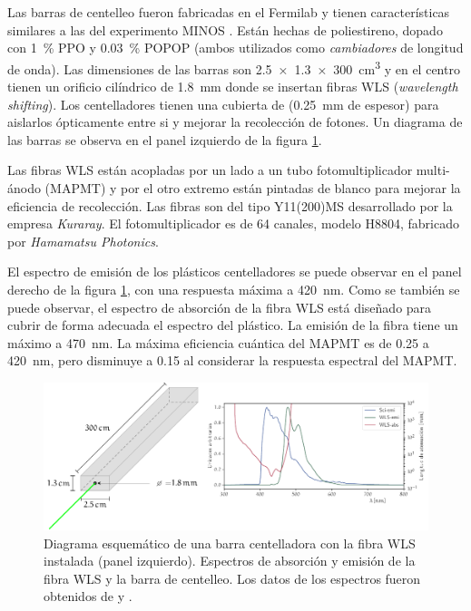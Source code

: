 Las barras de centelleo fueron fabricadas en el Fermilab y tienen características similares a las del experimento MINOS \cite{knitta04}. Están hechas de poliestireno, dopado con \SI{1}{\percent} PPO y \SI{0.03}{\percent} POPOP (ambos utilizados como \emph{cambiadores} de longitud de onda). Las dimensiones de las barras son \SI[product-units=power]{2.5x1.3x300}{\cubic\cm} y en el centro tienen un orificio cilíndrico de \SI{1.8}{\mm} donde se insertan fibras WLS (\emph{wavelength shifting}). Los centelladores tienen una cubierta de  (\SI{0.25}{\mm} de espesor) para aislarlos ópticamente entre si y mejorar la recolección de fotones. Un diagrama de las barras se observa en el panel izquierdo de la figura \ref{fig:scibar-optics}.

Las fibras WLS están acopladas por un lado a un tubo fotomultiplicador multi-ánodo (MAPMT) y por el otro extremo están pintadas de blanco para mejorar la eficiencia de recolección. Las fibras son del tipo Y11(200)MS desarrollado por la empresa \emph{Kuraray}. El fotomultiplicador es de \num{64} canales, modelo H8804, fabricado por \emph{Hamamatsu Photonics}.

El espectro de emisión de los plásticos centelladores se puede observar en el panel derecho de la figura \ref{fig:scibar-optics}, con una respuesta máxima a \SI{420}{\nano\metre}. Como se también se puede observar, el espectro de absorción de la fibra WLS está diseñado para cubrir de forma adecuada el espectro del plástico. La emisión de la fibra tiene un máximo a \SI{470}{\nano\metre}. La máxima eficiencia cuántica del MAPMT es de \num{0.25} a \SI{420}{\nano\metre}, pero disminuye a \num{0.15} al considerar la respuesta espectral del MAPMT.

\begin{figure}
        \centering
        \includegraphics[width=\textwidth]{scibar.pdf}
        \caption{Diagrama esquemático de una barra centelladora con la fibra WLS instalada (panel izquierdo). Espectros de absorción y emisión de la fibra WLS y la barra de centelleo. Los datos de los espectros fueron obtenidos de \cite{kikawa14} y \cite{dietz16}.}
        \label{fig:scibar-optics}
\end{figure}

